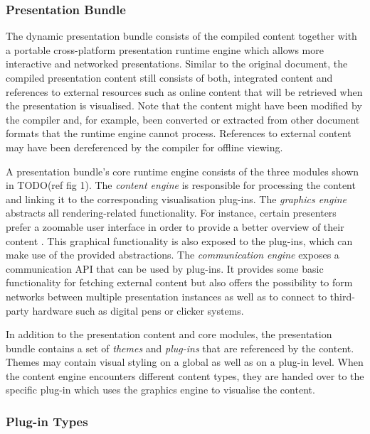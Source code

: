 \documentclass[a4paper,12pt]{report}
\begin{document}
    \subsubsection{\mxp Presentation Bundle}

     The dynamic \mxp presentation bundle consists of the compiled content
     together with a portable cross-platform presentation runtime engine which
     allows more interactive and networked presentations. Similar to the original
     document, the compiled presentation content still consists of both, integrated
     content and references to external resources such as online content that will
     be retrieved when the presentation is visualised. Note that the content might
     have been modified by the compiler and, for example, been converted or
     extracted from other document formats that the runtime engine cannot process.
     References to external content may have been dereferenced by the compiler for
     offline viewing.

     A presentation bundle's core runtime engine consists of the three modules
     shown in TODO(ref fig 1). The \emph{content engine} is responsible for
     processing the content and linking it to the corresponding visualisation
     plug-ins. The \emph{graphics engine} abstracts all rendering-related
     functionality. For instance, certain presenters prefer a zoomable user
     interface in order to provide a better overview of their content
     \citep{reuss-1}. This graphical functionality is also exposed to the plug-ins,
     which can make use of the provided abstractions. The \emph{communication
     engine} exposes a communication API that can be used by plug-ins. It provides
     some basic functionality for fetching external content but also offers the
     possibility to form networks between multiple \mxp presentation instances as
     well as to connect to third-party hardware such as digital pens or clicker
     systems.

     In addition to the presentation content and core modules, the presentation
     bundle contains a set of \emph{themes} and \emph{plug-ins} that are referenced
     by the content. Themes may contain visual styling on a global as well as on a
     plug-in level. When the content engine encounters different content types, they
     are handed over to the specific plug-in which uses the graphics engine to
     visualise the content.

    \subsubsection{Plug-in Types}
\end{document}
